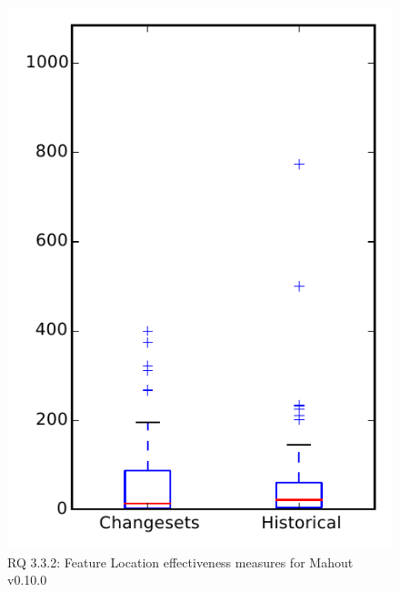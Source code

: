 
\begin{figure}
\centering
\includegraphics[height=0.4\textheight]{figures/flt/rq2_mahout}
\caption{RQ 3.3.2: Feature Location effectiveness measures for Mahout v0.10.0}
\label{fig:flt:rq2:mahout}
\end{figure}
